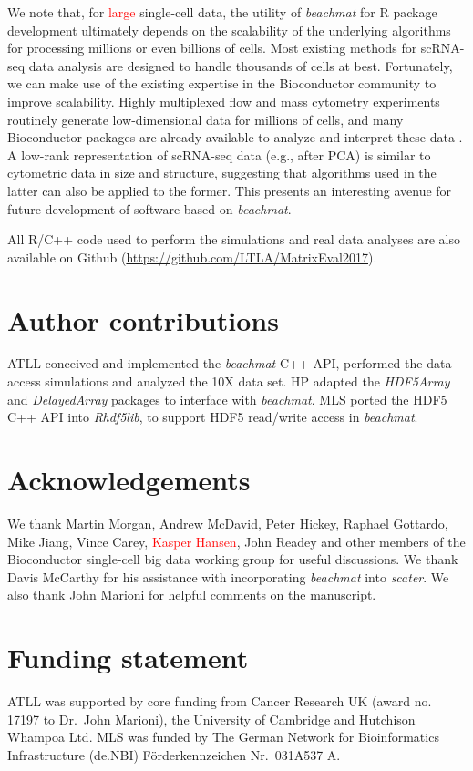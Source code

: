 \documentclass[10pt,letterpaper]{article}
\newcommand{\beachmat}{\textit{beachmat}}
\newcommand{\revised}[1]{\textcolor{red}{#1}}
\begin{document}
We note that, for \revised{large} single-cell data, the utility of \beachmat{} for R package development ultimately depends on the scalability of the underlying algorithms for processing millions or even billions of cells.
Most existing methods for scRNA-seq data analysis are designed to handle thousands of cells at best.
Fortunately, we can make use of the existing expertise in the Bioconductor community to improve scalability.
Highly multiplexed flow and mass cytometry experiments routinely generate low-dimensional data for millions of cells,
and many Bioconductor packages are already available to analyze and interpret these data \cite{finak2014opencyto,weber2016comparison,lun2017testing}.
A low-rank representation of scRNA-seq data (e.g., after PCA) is similar to cytometric data in size and structure, suggesting that algorithms used in the latter can also be applied to the former.
This presents an interesting avenue for future development of software based on \beachmat{}.

All R/C++ code used to perform the simulations and real data analyses are also available on Github (\url{https://github.com/LTLA/MatrixEval2017}).

\section*{Author contributions}
ATLL conceived and implemented the \beachmat{} C++ API, performed the data access simulations and analyzed the 10X data set.
HP adapted the \textit{HDF5Array} and \textit{DelayedArray} packages to interface with \beachmat{}.
MLS ported the HDF5 C++ API into \textit{Rhdf5lib}, to support HDF5 read/write access in \beachmat{}.

\section*{Acknowledgements}
We thank Martin Morgan, Andrew McDavid, Peter Hickey, Raphael Gottardo, Mike Jiang, Vince Carey, \revised{Kasper Hansen}, John Readey and other members of the Bioconductor single-cell big data working group for useful discussions.
We thank Davis McCarthy for his assistance with incorporating \beachmat{} into \textit{scater}.
We also thank John Marioni for helpful comments on the manuscript.

\section*{Funding statement}
ATLL was supported by core funding from Cancer Research UK (award no. 17197 to Dr.\ John Marioni), the University of Cambridge and Hutchison Whampoa Ltd.
MLS was funded by The German Network for Bioinformatics Infrastructure (de.NBI) F\"orderkennzeichen Nr.\ 031A537 A.


\end{document}
